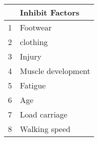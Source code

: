 \begin{tabular}{rl}
\toprule
    &  Inhibit Factors \\
\midrule
  1 & Footwear               \\
  2 & clothing               \\
  3 & Injury                 \\
  4 & Muscle development     \\
  5 & Fatigue                \\
  6 & Age                    \\
  7 & Load carriage          \\
  8 & Walking speed          \\
  
\bottomrule
\end{tabular}

